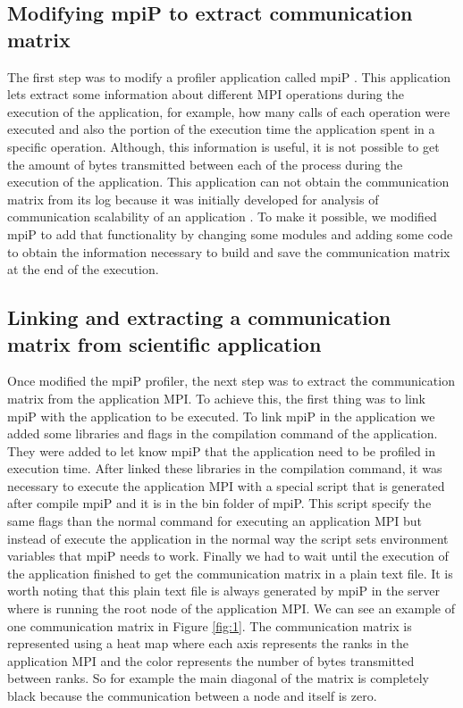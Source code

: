 \documentclass[journal]{IEEEtran}
\begin{document}
\begin{NoHyper}
\subsection{Modifying mpiP to extract communication matrix}

The first step was to modify a profiler application called mpiP \cite{mpiP}. This application lets extract some information about different MPI operations during the execution of the application, for example, how many calls of each operation were executed and also the portion of the execution time the application spent in a specific operation. Although, this information is useful, it is not possible to get the amount of bytes transmitted between each of the process during the execution of the application. This application can not obtain the communication matrix from its log because it was initially developed for analysis of communication scalability of an application \cite{Roth}. To make it possible, we modified mpiP to add that functionality by changing some modules and adding some code to obtain the information necessary to build and save the communication matrix at the end of the execution.

\subsection{Linking and extracting a communication matrix from scientific application}

Once modified the mpiP profiler, the next step was to extract the communication matrix from the application MPI. To achieve this, the first thing was to link mpiP with the application to be executed. To link mpiP in the application we added some libraries and flags in the compilation command of the application. They were added to let know mpiP that the application need to be profiled in execution time. After linked these libraries in the compilation command, it was necessary to execute the application MPI with a special script that is generated after compile mpiP and it is in the bin folder of mpiP. This script specify the same flags than the normal command for executing an application MPI but instead of execute the application in the normal way the script sets environment variables that mpiP needs to work. Finally we had to wait until the execution of the application finished to get the communication matrix in a plain text file. It is worth noting that this plain text file is always generated by mpiP in the server where is running the root node of the application MPI. We can see an example of one communication matrix in Figure \ref{fig:1}. The communication matrix is represented using a heat map where each axis represents the ranks in the application MPI and the color represents the number of bytes transmitted between ranks. So for example the main diagonal of the matrix is completely black because the communication between a node and itself is zero.


\end{NoHyper}
\end{document}
